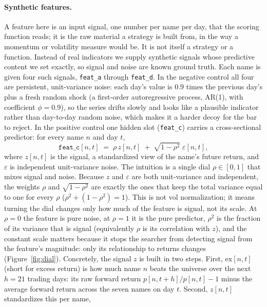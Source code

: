 \documentclass[11pt]{article}
\newcommand{\code}[1]{\texttt{#1}}
\begin{document}
\paragraph{Synthetic features.} A feature here is an input signal, one number per name per day, that the
scoring function reads; it is the raw material a strategy is built from, in the way a momentum or
volatility measure would be. It is not itself a strategy or a function. Instead of real indicators we
supply synthetic signals whose predictive content we set exactly, so signal and noise are known ground
truth. Each name is given four such signals, \code{feat\_a} through \code{feat\_d}. In the negative
control all four are persistent, unit-variance noise: each day's value is $0.9$ times the previous day's
plus a fresh random shock (a first-order autoregressive process, AR(1), with coefficient $\phi=0.9$), so
the series drifts slowly and looks like a plausible indicator rather than day-to-day random noise, which
makes it a harder decoy for the bar to reject. In the positive control one
hidden slot (\code{feat\_c}) carries a cross-sectional predictor: for every name $n$ and day $t$,
\begin{equation}
\code{feat\_c}[n,t] \;=\; \rho \, z[n,t] \;+\; \sqrt{1-\rho^{2}}\;\varepsilon[n,t],
\label{eq:synth}
\end{equation}
where $z[n,t]$ is the signal, a standardized view of the name's future return, and $\varepsilon$ is
independent unit-variance noise. The intuition is a single dial $\rho\in[0,1]$ that mixes signal and
noise. Because $z$ and $\varepsilon$ are both unit-variance and independent, the weights $\rho$ and
$\sqrt{1-\rho^{2}}$ are exactly the ones that keep the total variance equal to one for every $\rho$
($\rho^{2}+(1-\rho^{2})=1$). This is not vol normalization; it means turning the dial changes only how
much of the feature is signal, not its scale. At $\rho=0$ the feature is pure noise, at $\rho=1$ it is
the pure predictor, $\rho^{2}$ is the fraction of its variance that is signal (equivalently $\rho$ is its
correlation with $z$), and the constant scale matters because it stops the searcher from detecting signal
from the feature's magnitude: only its relationship to returns changes (Figure~\ref{fig:dial}).
Concretely, the signal $z$ is
built in two steps. First, $\mathrm{ex}[n,t]$ (short for excess return) is how much name $n$ beats the
universe over the next $h=21$ trading days: its raw forward return $p[n,t{+}h]/p[n,t]-1$ minus the
average forward return across the seven names on day $t$. Second, $z[n,t]$ standardizes this per name,
\end{document}
